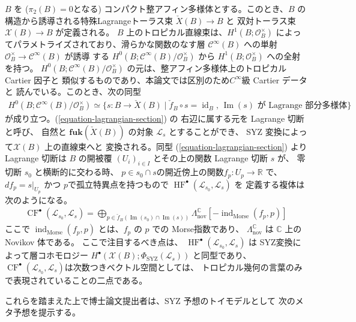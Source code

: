 \documentclass[uplatex,dvipdfmx,12pt]{jsarticle}
\numberwithin{equation}{section}
\theoremstyle{definition}
\newcommand{\opn}[1]{\operatorname{#1}}
\newcommand{\catn}[1]{\mathbf{#1}}
\begin{document}
$B$ を
($\pi_2(B)=0$となる)
コンパクト整アフィン多様体とする。このとき、$B$ の
構造から誘導される特殊Lagrangeトーラス束 
$\check{X}(B)\to B$ と 
双対トーラス束 $\mathcal{X}(B)\to B$ が定義される。
$B$ 上のトロピカル直線束は、$H^{1}(B;\mathcal{O}^{\times}_B)$
によってパラメトライズされており、滑らかな関数のなす層 
$\mathcal{C}^{\infty}(B)$ への単射 
$\mathcal{O}_{B}^{\times}\to \mathcal{C}^{\infty}(B)$ が誘導
する $H^{0}(B;\mathcal{C}^{\infty}(B)/\mathcal{O}_{B}^{\times})$
から $H^{1}(B;\mathcal{O}^{\times}_B)$ への全射を持つ。
$H^{0}(B;\mathcal{C}^{\infty}(B)/\mathcal{O}_{B}^{\times})$
の元は、整アフィン多様体上のトロピカル Cartier 因子と
類似するものであり、本論文では区別のため$C^{\infty}$級
Cartier データと
読んでいる。このとき、次の同型
\begin{align} \label{equation-lagrangian-section}
H^{0}(B;\mathcal{C}^{\infty}(B)/\mathcal{O}_{B}^{\times})
\simeq \{s\colon B\to \check{X}(B)\mid 
\check{f}_{B}\circ s=\opn{id}_B, \,
\opn{Im}(s) \text{ が Lagrange 部分多様体} \}
\end{align}
が成り立つ。(\ref{equation-lagrangian-section}) の
右辺に属する元を Lagrange 切断と呼び、
自然と $\catn{fuk}(\check{X}(B))$ の対象
$\mathscr{L}_s$ とすることができ、
SYZ 変換によって$\mathcal{X}(B)$ 上の直線束へと
変換される。同型 (\ref{equation-lagrangian-section})
より Lagrange 切断は $B$ の開被覆 $(U_i)_{i\in I}$ 
とその上の関数
Lagrange 切断 $s$ が、
零切断 $s_0$ と横断的に交わる時、
$p\in s_0\cap s$の開近傍上の関数$f_p\colon U_p\to \mathbb{R}$
で、$df_p=s|_{U_p}$ かつ $p$で孤立特異点を持つもので 
$\opn{HF}^{\bullet}(\mathscr{L}_{s_0},\mathscr{L}_s)$ を
定義する複体は次のようになる\cite{MR1882331}。
\begin{align}
\opn{CF}^{\bullet}(\mathscr{L}_{s_0},
\mathscr{L}_s)=\bigoplus_{p\in \check{f}_{B}(\opn{Im}(s_0)\cap \opn{Im}(s))}
\Lambda^{\mathbb{C}}_{\mathrm{nov}}[-\opn{ind}_{\mathrm{Morse}}(f_p,p)]
\end{align}
ここで
$\opn{ind}_{\mathrm{Morse}}(f_p,p)$
とは、$f_p$ の $p$ での Morse指数であり、
$\Lambda^{\mathbb{C}}_{\mathrm{nov}}$ は
$\mathbb{C}$ 上の Novikov 体である。
ここで注目するべき点は、
$\opn{HF}^{\bullet}(\mathscr{L}_{s_0},\mathscr{L}_{s})$
は SYZ変換によって層コホモロジー
$H^{\bullet}(\mathcal{X}(B);
\Phi_{\opn{SYZ}}(\mathscr{L}_{s}))$
と同型であり\cite{MR4301560}、
$\opn{CF}^{\bullet}(\mathscr{L}_{s_0},
\mathscr{L}_s)$は次数つきベクトル空間としては、
トロピカル幾何の言葉のみで表現されていることの二点である。

これらを踏まえた上で博士論文提出者は、SYZ 予想のトイモデルとして
次のメタ予想を提示する。
\end{document}
